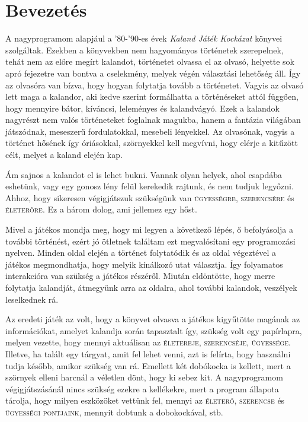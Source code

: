 \documentclass[12pt,a4paper,oneside]{report}
\newcommand{\stat}{\textsc}
\begin{document}

\tableofcontents

\newcommand{\chap}[1]{
  \addcontentsline{toc}{chapter}{#1}
  \addtocounter{chapter}{1}
  \chapter*{#1}
}

\chapter*{Bevezetés}

  A nagyprogramom alapjául a '80-'90-es évek \emph{Kaland Játék Kockázat}
  könyvei szolgáltak. Ezekben a könyvekben nem hagyományos történetek
  szerepelnek, tehát nem az előre megírt kalandot, történetet olvassa el
  az olvasó, helyette sok apró fejezetre van bontva a cselekmény, melyek
  végén választási lehetőség áll. Így az olvasóra van bízva, hogy hogyan
  folytatja tovább a történetet. Vagyis az olvasó lett maga a kalandor,
  aki kedve szerint formálhatta a történéseket attól függően, hogy
  mennyire bátor, kíváncsi, leleményes és kalandvágyó. Ezek a kalandok
  nagyrészt nem valós történeteket foglalnak magukba, hanem a fantázia
  világában játszódnak, meseszerű fordulatokkal, mesebeli lényekkel. Az
  olvasónak, vagyis a történet hősének így óriásokkal, szörnyekkel kell
  megvívni, hogy elérje a kitűzött célt, melyet a kaland elején kap.
  
  Ám sajnos a kalandot el is lehet bukni. Vannak olyan helyek, ahol
  csapdába eshetünk, vagy egy gonosz lény felül kerekedik rajtunk, és
  nem tudjuk legyőzni. Ahhoz, hogy sikeresen végigjátszuk szükségünk
  van \stat{ügyességre}, \stat{szerencsére} és \stat{életerőre}. Ez a
  három dolog, ami jellemez egy hőst.

  Mivel a játékos mondja meg, hogy mi legyen a következő lépés, ő
  befolyásolja a további történést, ezért jó ötletnek találtam ezt
  megvalósítani egy programozási nyelven. Minden oldal elején a történet
  folytatódik és az oldal végeztével a játékos megmondhatja, hogy
  melyik kínálkozó utat választja. Így folyamatos interakcióra van
  szükség a játékos részéről. Miután eldöntötte, hogy merre folytatja
  kalandját, átmegyünk arra az oldalra, ahol további kalandok, veszélyek
  leselkednek rá.
  
  Az eredeti játék az volt, hogy a könyvet olvasva a játékos
  kigyűtötte magának az információkat, amelyet kalandja során
  tapasztalt így, szükség volt egy papírlapra, melyen vezette, hogy
  mennyi aktuálisan az \stat{életereje}, \stat{szerencséje},
  \stat{ügyessége}. Illetve, ha talált egy tárgyat, amit fel lehet
  venni, azt is felírta, hogy használni tudja később, amikor szükség
  van rá. Emellett két dobókocka is kellett, mert a szörnyek elleni
  harcnál a véletlen dönt, hogy ki sebez kit. A nagyprogramom
  végigjátszásánál nincs szükség ezekre a kellékekre, mert a program
  állapota tárolja, hogy milyen eszközöket vettünk fel, mennyi az
  \stat{életerő}, \stat{szerencse} és \stat{ügyességi pontjaink},
  mennyit dobtunk a dobokockával, stb.
  
\end{document}
